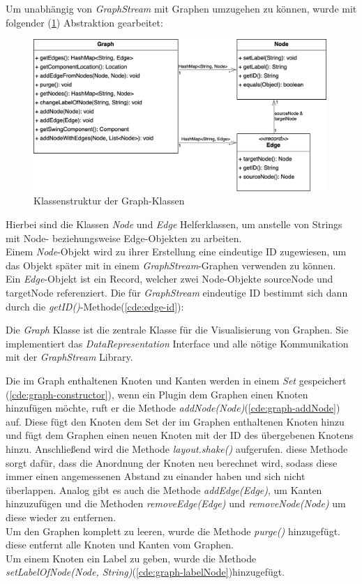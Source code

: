 Um unabhängig von \textit{GraphStream} mit Graphen umzugehen zu können, wurde mit
folgender (\cref{fig:graph-classes}) Abstraktion gearbeitet:\\
\begin{figure}[h]
  \centering
  \vspace{-20pt}
  \includegraphics[width=0.99\textwidth]{fig/GUI_Graph_classes_methods.png}
  \caption{Klassenstruktur der Graph-Klassen}%
  \label{fig:graph-classes}
\end{figure}


Hierbei sind die Klassen \textit{Node} und \textit{Edge} Helferklassen, um
anstelle von Strings mit Node- beziehungsweise Edge-Objekten zu arbeiten.\\
Einem \textit{Node}-Objekt wird zu ihrer Erstellung eine eindeutige ID zugewiesen,
um das Objekt später mit in einem \textit{GraphStream}-Graphen verwenden zu können.\\
Ein \textit{Edge}-Objekt ist ein Record, welcher zwei Node-Objekte
sourceNode und targetNode referenziert. Die für \textit{GraphStream}
eindeutige ID bestimmt sich dann durch die \textit{getID()}-Methode(\cref{cde:edge-id}):

Die \textit{Graph} Klasse ist die zentrale Klasse für die Visualisierung von Graphen.
Sie implementiert das \textit{DataRepresentation} Interface und
alle nötige Kommunikation mit der \textit{GraphStream} Library.

Die im Graph enthaltenen Knoten und Kanten werden in einem \textit{Set} gespeichert (\cref{cde:graph-constructor}),
wenn ein Plugin dem Graphen einen Knoten hinzufügen möchte,
ruft er die Methode \textit{addNode(Node)}(\cref{cde:graph-addNode}) auf.
Diese fügt den Knoten dem Set der im Graphen enthaltenen Knoten hinzu und
fügt dem Graphen einen neuen Knoten mit der ID des übergebenen Knotens hinzu.
Anschließend wird die Methode \textit{layout.shake()} aufgerufen.
diese Methode sorgt dafür, dass die Anordnung der Knoten neu berechnet wird,
sodass diese immer einen angemessenen Abstand zu einander haben und sich nicht überlappen. 
Analog gibt es auch die Methode \textit{addEdge(Edge)}, um Kanten hinzuzufügen
und die Methoden \textit{removeEdge(Edge)} und \textit{removeNode(Node)}
um diese wieder zu entfernen.\\
Um den Graphen komplett zu leeren, wurde die Methode \textit{purge()} hinzugefügt.
diese entfernt alle Knoten und Kanten vom Graphen.\\
Um einem Knoten ein Label zu geben, wurde die Methode\\
\textit{setLabelOfNode(Node, String)}(\cref{cde:graph-labelNode})hinzugefügt.

